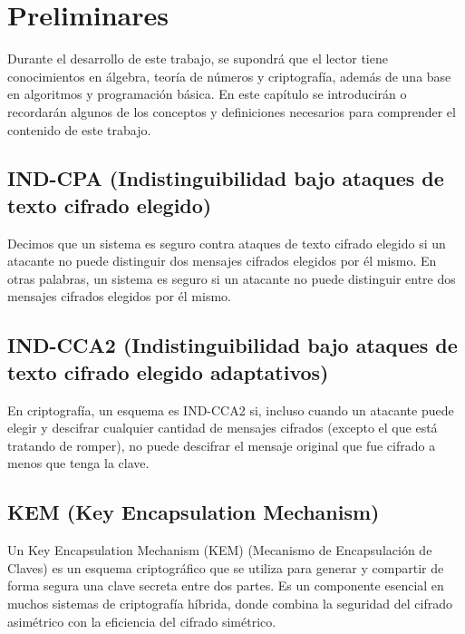 
\chapter{Preliminares}
Durante el desarrollo de este trabajo, se supondrá que el lector tiene conocimientos en álgebra, teoría de números y criptografía, además de una base en algoritmos y programación básica. En este capítulo se introducirán o recordarán algunos de los conceptos y definiciones necesarios para comprender el contenido de este trabajo.
\section{IND-CPA (Indistinguibilidad bajo ataques de texto cifrado elegido)}
Decimos que un sistema es seguro contra ataques de texto cifrado elegido si un atacante no puede distinguir dos mensajes cifrados elegidos por él mismo. En otras palabras, un sistema es seguro si un atacante no puede distinguir entre dos mensajes cifrados elegidos por él mismo.
\section{IND-CCA2 (Indistinguibilidad bajo ataques de texto cifrado elegido adaptativos)}
En criptografía, un esquema es IND-CCA2 si, incluso cuando un atacante puede elegir y descifrar cualquier cantidad de mensajes cifrados (excepto el que está tratando de romper), no puede descifrar el mensaje original que fue cifrado a menos que tenga la clave. 

\section{KEM (Key Encapsulation Mechanism)}
Un Key Encapsulation Mechanism (KEM) (Mecanismo de Encapsulación de Claves) es un esquema criptográfico que se utiliza para generar y compartir de forma segura una clave secreta entre dos partes. Es un componente esencial en muchos sistemas de criptografía híbrida, donde combina la seguridad del cifrado asimétrico con la eficiencia del cifrado simétrico.


\section{}
\section{}

\endinput
